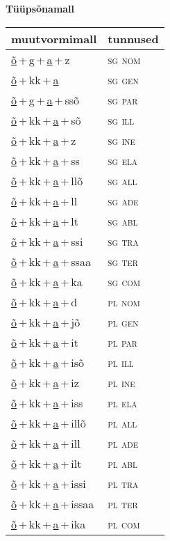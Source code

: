 
\vspace{1.8em}
\begin{minipage}{\textwidth}
\textbf{Tüüpsõnamall \,}\\

\begin{sideways}
\begin{tabular}{l l}
muutvormimall & tunnused \\
\hline
\underline{õ}\,+\,g\,+\,\underline{a}\,+\,z & \textsc{ sg nom } \\
\underline{õ}\,+\,kk\,+\,\underline{a} & \textsc{ sg gen } \\
\underline{õ}\,+\,g\,+\,\underline{a}\,+\,ssõ & \textsc{ sg par } \\
\underline{õ}\,+\,kk\,+\,\underline{a}\,+\,sõ & \textsc{ sg ill } \\
\underline{õ}\,+\,kk\,+\,\underline{a}\,+\,z & \textsc{ sg ine } \\
\underline{õ}\,+\,kk\,+\,\underline{a}\,+\,ss & \textsc{ sg ela } \\
\underline{õ}\,+\,kk\,+\,\underline{a}\,+\,llõ & \textsc{ sg all } \\
\underline{õ}\,+\,kk\,+\,\underline{a}\,+\,ll & \textsc{ sg ade } \\
\underline{õ}\,+\,kk\,+\,\underline{a}\,+\,lt & \textsc{ sg abl } \\
\underline{õ}\,+\,kk\,+\,\underline{a}\,+\,ssi & \textsc{ sg tra } \\
\underline{õ}\,+\,kk\,+\,\underline{a}\,+\,ssaa & \textsc{ sg ter } \\
\underline{õ}\,+\,kk\,+\,\underline{a}\,+\,ka & \textsc{ sg com } \\
\underline{õ}\,+\,kk\,+\,\underline{a}\,+\,d & \textsc{ pl nom } \\
\underline{õ}\,+\,kk\,+\,\underline{a}\,+\,jõ & \textsc{ pl gen } \\
\underline{õ}\,+\,kk\,+\,\underline{a}\,+\,it & \textsc{ pl par } \\
\underline{õ}\,+\,kk\,+\,\underline{a}\,+\,isõ & \textsc{ pl ill } \\
\underline{õ}\,+\,kk\,+\,\underline{a}\,+\,iz & \textsc{ pl ine } \\
\underline{õ}\,+\,kk\,+\,\underline{a}\,+\,iss & \textsc{ pl ela } \\
\underline{õ}\,+\,kk\,+\,\underline{a}\,+\,illõ & \textsc{ pl all } \\
\underline{õ}\,+\,kk\,+\,\underline{a}\,+\,ill & \textsc{ pl ade } \\
\underline{õ}\,+\,kk\,+\,\underline{a}\,+\,ilt & \textsc{ pl abl } \\
\underline{õ}\,+\,kk\,+\,\underline{a}\,+\,issi & \textsc{ pl tra } \\
\underline{õ}\,+\,kk\,+\,\underline{a}\,+\,issaa & \textsc{ pl ter } \\
\underline{õ}\,+\,kk\,+\,\underline{a}\,+\,ika & \textsc{ pl com } \\
\end{tabular}
\end{sideways}
\label{tab:tüüpsõnamall-õgaz}


\end{minipage}
